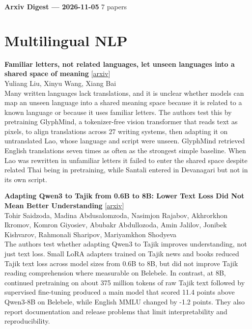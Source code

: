 \documentclass[12pt,letterpaper]{article}
\begin{document}
{\footnotesize\textbf{Arxiv Digest --- 2026-11-05} \hfill 7 papers}

\smallskip

\section*{Multilingual NLP}

\begin{minipage}{\linewidth}
{\small\textbf{Familiar letters, not related languages, let unseen languages into a shared space of meaning}} {\scriptsize[\href{https://arxiv.org/abs/2611.06006}{arxiv}]}\\
{\scriptsize Yuliang Liu, Xinyu Wang, Xiang Bai}\\


{\footnotesize Many written languages lack translations, and it is unclear whether models can map an unseen language into a shared meaning space because it is related to a known language or because it uses familiar letters. The authors test this by pretraining GlyphMind, a tokenizer-free vision transformer that reads text as pixels, to align translations across 27 writing systems, then adapting it on untranslated Lao, whose language and script were unseen. GlyphMind retrieved English translations seven times as often as the strongest simple baseline. When Lao was rewritten in unfamiliar letters it failed to enter the shared space despite related Thai being in pretraining, while Santali entered in Devanagari but not in its own script.}

\end{minipage}

\medskip

\begin{minipage}{\linewidth}
{\small\textbf{Adapting Qwen3 to Tajik from 0.6B to 8B: Lower Text Loss Did Not Mean Better Understanding}} {\scriptsize[\href{https://arxiv.org/abs/2611.06062}{arxiv}]}\\
{\scriptsize Tohir Saidzoda, Madina Abdusalomzoda, Nasimjon Rajabov, Akhrorkhon Ikromov, Komron Giyosiev, Abubakr Abdullozoda, Amin Jalilov, Jonibek Kishvarov, Rahmonali Sharipov, Mariyamkhon Shodyeva}\\


{\footnotesize The authors test whether adapting Qwen3 to Tajik improves understanding, not just text loss. Small LoRA adapters trained on Tajik news and books reduced Tajik text loss across model sizes from 0.6B to 8B, but did not improve Tajik reading comprehension where measurable on Belebele. In contrast, at 8B, continued pretraining on about 375 million tokens of raw Tajik text followed by supervised fine-tuning produced a main model that scored 11.4 points above Qwen3-8B on Belebele, while English MMLU changed by -1.2 points. They also report documentation and release problems that limit interpretability and reproducibility.}

\end{minipage}
\end{document}
